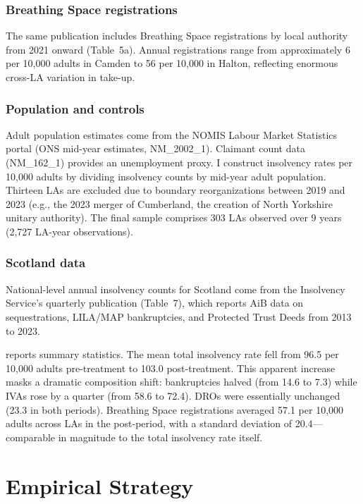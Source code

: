 \documentclass[12pt]{article}
\begin{document}
\subsubsection*{Breathing Space registrations} The same publication includes Breathing Space registrations by local authority from 2021 onward (Table~5a). Annual registrations range from approximately 6 per 10,000 adults in Camden to 56 per 10,000 in Halton, reflecting enormous cross-LA variation in take-up.

\subsubsection*{Population and controls} Adult population estimates come from the NOMIS Labour Market Statistics portal (ONS mid-year estimates, NM\_2002\_1). Claimant count data (NM\_162\_1) provides an unemployment proxy. I construct insolvency rates per 10,000 adults by dividing insolvency counts by mid-year adult population. Thirteen LAs are excluded due to boundary reorganizations between 2019 and 2023 (e.g., the 2023 merger of Cumberland, the creation of North Yorkshire unitary authority). The final sample comprises 303 LAs observed over 9 years (2,727 LA-year observations).

\subsubsection*{Scotland data} National-level annual insolvency counts for Scotland come from the Insolvency Service's quarterly publication (Table~7), which reports AiB data on sequestrations, LILA/MAP bankruptcies, and Protected Trust Deeds from 2013 to 2023.



 reports summary statistics. The mean total insolvency rate fell from 96.5 per 10,000 adults pre-treatment to 103.0 post-treatment. This apparent increase masks a dramatic composition shift: bankruptcies halved (from 14.6 to 7.3) while IVAs rose by a quarter (from 58.6 to 72.4). DROs were essentially unchanged (23.3 in both periods). Breathing Space registrations averaged 57.1 per 10,000 adults across LAs in the post-period, with a standard deviation of 20.4---comparable in magnitude to the total insolvency rate itself.

\section{Empirical Strategy}
\end{document}
